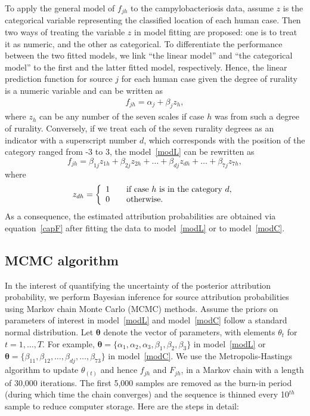 \documentclass[times, doublespace]{simauth}%
\begin{document}
To apply the general model of $f_{jh}$ to the campylobacteriosis data, assume $z$ is the categorical variable representing the classified location of each human case. Then two ways of treating the variable $z$ in model fitting are proposed: one is to treat it as numeric, and the other as categorical. To differentiate the performance between the two fitted models, we link ``the linear model'' and ``the categorical model'' to the first and the latter fitted model, respectively. Hence, the linear prediction function for source $j$ for each human case given the degree of rurality is a numeric variable and can be written as
\begin{align}
  f_{jh} = \alpha_{j} + \beta_{j} z_{h},
  \label{modL}
\end{align}
where $z_{h}$ can be any number of the seven scales if case $h$ was from such a degree of rurality. Conversely, if we treat each of the seven rurality degrees as an indicator with a superscript number $d$, which corresponds with the position of the category ranged from -3 to 3, the model~\eqref{modL} can be rewritten as
\begin{equation}
  f_{jh} = \beta_{1j} z_{1h}+ \beta_{2j} z_{2h} + \ldots + \beta_{dj} z_{dh} + \ldots +  \beta_{7j} z_{7h},
  \label{modC}
\end{equation}
where
\begin{equation*}
z_{dh} =
\left\{\begin{array}{rcl}
1 && \mbox{if case $h$ is in the category $d$,} \notag \\ 0 && \mbox{otherwise}.
\end{array}\right.
\end{equation*}
As a consequence, the estimated attribution probabilities are obtained via equation~\eqref{capF} after fitting the data to model~\eqref{modL} or to model~\eqref{modC}.

\subsection{MCMC algorithm}
In the interest of quantifying the uncertainty of the posterior attribution probability, we perform Bayesian inference for source attribution probabilities using Markov chain Monte Carlo (MCMC) methods. Assume the priors on parameters of interest in model~\eqref{modL} and model~\eqref{modC} follow a standard normal distribution. Let $\boldsymbol{\theta}$ denote the vector of parameters, with elements $\theta_{t}$ for $t=1, \ldots, T$. For example, $\boldsymbol{\theta}=\{\alpha_1, \alpha_2, \alpha_3, \beta_1, \beta_2, \beta_3\}$ in model~\eqref{modL} or $\boldsymbol{\theta}=\{\beta_{11}, \beta_{12}, \ldots, \beta_{dj}, \ldots, \beta_{73}\}$ in model~\eqref{modC}. We use the Metropolis-Hastings algorithm to update $\theta_{(t)}$ and hence $f_{jh}$ and $ F_{jh}$, in a Markov chain with a length of 30,000 iterations. The first 5,000 samples are removed as the burn-in period (during which time the chain converges) and the sequence is thinned every 10$^{th}$ sample to reduce computer storage. Here are the steps in detail:
\end{document}
